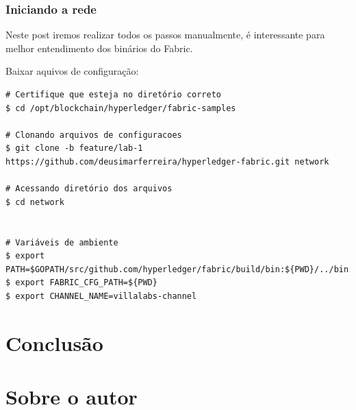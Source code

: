 \documentclass[a4paper,11pt]{article}
\begin{document}
\subsubsection{Iniciando a rede}
Neste post iremos realizar todos os passos manualmente, é interessante para melhor entendimento dos binários do Fabric.

Baixar aquivos de configuração:
\begin{lstlisting}
# Certifique que esteja no diretório correto
$ cd /opt/blockchain/hyperledger/fabric-samples

# Clonando arquivos de configuracoes
$ git clone -b feature/lab-1 https://github.com/deusimarferreira/hyperledger-fabric.git network

# Acessando diretório dos arquivos
$ cd network


# Variáveis de ambiente
$ export PATH=$GOPATH/src/github.com/hyperledger/fabric/build/bin:${PWD}/../bin:${PWD}:$PATH
$ export FABRIC_CFG_PATH=${PWD}
$ export CHANNEL_NAME=villalabs-channel
\end{lstlisting}

\section{Conclusão}

\section{Sobre o autor}

\end{document}
